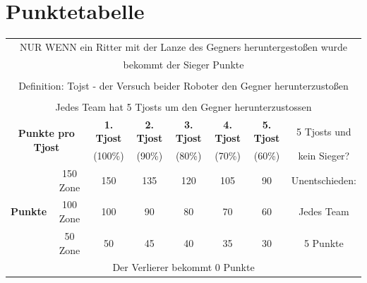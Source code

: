 \documentclass[a4paper,12pt]{article}
\begin{document}
\section{Punktetabelle}
\begin{center}
\begin{tabular}{|c|c|c|c|c|c|c|c|} \hline
	\multicolumn{8}{|c|}{NUR WENN ein Ritter mit der Lanze des Gegners heruntergestoßen wurde}\\
	\multicolumn{8}{|c|}{bekommt der Sieger Punkte}\\
	\multicolumn{8}{|c|}{}\\
	\multicolumn{8}{|c|}{Definition: Tojst - der Versuch beider Roboter den Gegner herunterzustoßen}\\
	\multicolumn{8}{|c|}{}\\
	\multicolumn{8}{|c|}{Jedes Team hat 5 Tjosts um den Gegner herunterzustossen} \\ \hline
	\multicolumn{2}{|c|}{\multirow{2}{*}{\textbf{Punkte pro Tjost}}} & \textbf{1. Tjost} & \textbf{2. Tjost} & \textbf{3. Tjost} & \textbf{4. Tjost} & \textbf{5. Tjost} & 5 Tjosts und \\
	\multicolumn{2}{|c|}{}  & (100\%) & (90\%) & (80\%) & (70\%) & (60\%) & kein Sieger? \\
	\cline{1-7}
	\multirow{3}{*}{\textbf{Punkte}} & 150 Zone & 150 & 135 & 120 & 105 & 90 & Unentschieden: \\
	\cline{2-7}
	& 100 Zone & 100 & 90 & 80 & 70 & 60 & Jedes Team \\
	\cline{2-7}
	& 50  Zone& 50 & 45 & 40 & 35 & 30 & 5 Punkte \\
	\hline
	\multicolumn{8}{|c|}{Der Verlierer bekommt 0 Punkte}\\
	\hline
\end{tabular}
\end{center}
\end{document}
